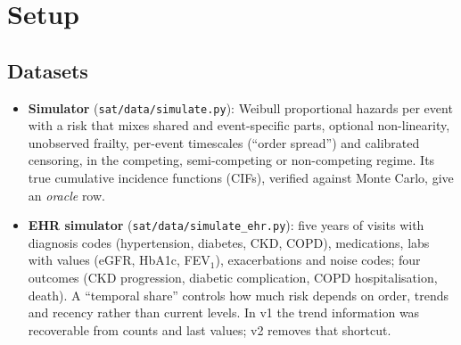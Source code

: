 \documentclass[11pt,a4paper]{article}
\begin{document}
\section{Setup}\label{sec:setup}

\subsection{Datasets}
\begin{table}[H]\centering\small
\caption{Datasets. ``Regime'': which events can be observed together.}
\end{table}
\begin{itemize}
  \item \textbf{Simulator} (\texttt{sat/data/simulate.py}): Weibull proportional hazards per event with a risk that
        mixes shared and event-specific parts, optional non-linearity, unobserved frailty, per-event timescales
        (``order spread'') and calibrated censoring, in the competing, semi-competing or non-competing regime. Its
        true cumulative incidence functions (CIFs), verified against Monte Carlo, give an \emph{oracle} row.
  \item \textbf{EHR simulator} (\texttt{sat/data/simulate\_ehr.py}): five years of visits with diagnosis codes
        (hypertension, diabetes, CKD, COPD), medications, labs with values (eGFR, HbA1c, FEV$_1$), exacerbations and
        noise codes; four outcomes (CKD progression, diabetic complication, COPD hospitalisation, death). A
        ``temporal share'' controls how much risk depends on order, trends and recency rather than current levels.
        In v1 the trend information was recoverable from counts and last values; v2 removes that shortcut.
\end{itemize}
\end{document}
